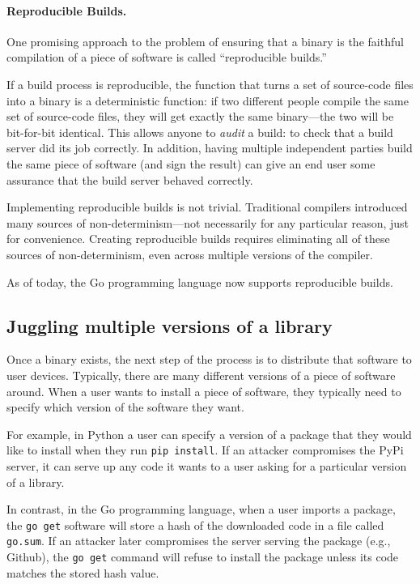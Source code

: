 \paragraph{Reproducible Builds.}
One promising approach to the problem of
ensuring that a binary is the faithful compilation
of a piece of software is called ``reproducible builds.''

If a build process is reproducible, the function that
turns a set of source-code files into a binary is
a deterministic function: if two different people compile
the same set of source-code files, they will get exactly
the same binary---the two will be bit-for-bit identical.
This allows anyone to \emph{audit} a build: to check that
a build server did its job correctly.
In addition, having multiple independent parties build
the same piece of software (and sign the result)
can give an end user some assurance that the build
server behaved correctly.

Implementing reproducible builds is not trivial.
Traditional compilers introduced many sources of 
non-determinism---not necessarily for any particular reason,
just for convenience.
Creating reproducible builds requires eliminating 
all of these sources of non-determinism, even across
multiple versions of the compiler.

As of today, the Go programming language now supports reproducible builds.

\subsection{Juggling multiple versions of a library}
Once a binary exists, the next step of the process
is to distribute that software to user devices.
Typically, there are many different versions of
a piece of software around.
When a user wants to install a piece of software,
they typically need to specify which version of
the software they want.

For example, in Python a user can specify 
a version of a package that they would like to 
install when they run \texttt{pip install}.
If an attacker compromises the PyPi server,
it can serve up any code it wants to a user
asking for a particular version of a library.

In contrast, in the Go programming language, 
when a user imports a package, the \texttt{go get}
software will store a hash of the downloaded code
in a file called \texttt{go.sum}.
If an attacker later compromises the server 
serving the package (e.g., Github), the \texttt{go get}
command will refuse to install the package unless its
code matches the stored hash value.

